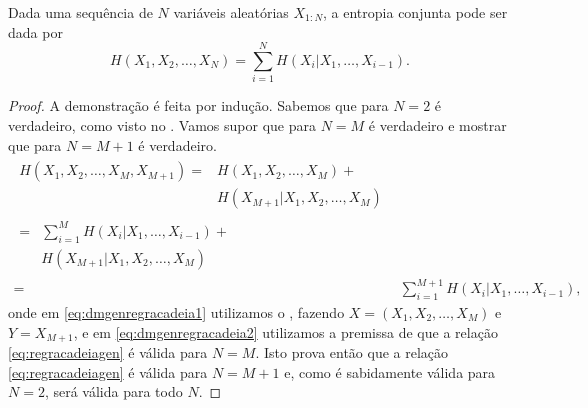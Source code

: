 \begin{proposition}\label{prop:regracadeiagen}
Dada uma sequência de $N$ variáveis aleatórias $X_{1:N}$, a entropia conjunta pode ser dada por 
\begin{equation}\label{eq:regracadeiagen}
H(X_1, X_2, \ldots, X_N) = \sum_{i=1}^{N} H(X_i|X_1, \ldots, X_{i-1}) .
\end{equation}
\end{proposition}
\begin{proof}
A demonstração é feita por indução. Sabemos que para $N=2$ é verdadeiro, como visto no .
Vamos supor que para $N=M$ é verdadeiro e mostrar que para $N=M+1$ é verdadeiro.
\begin{subequations}\label{eq:dmgenregracadeia}
\begin{align}
  \begin{split}
  H(X_1, X_2, \ldots, X_M, X_{M+1}) ={}& H(X_1, X_2, \ldots, X_M) + \\
                                       & H(X_{M+1} | X_1, X_2, \ldots, X_M) \label{eq:dmgenregracadeia1}
  \end{split}\\
  \begin{split}
                                    ={}& \sum_{i=1}^{M} H(X_i|X_1, \ldots, X_{i-1}) + \\
                                       & H(X_{M+1} | X_1, X_2, \ldots, X_M) \label{eq:dmgenregracadeia2}
  \end{split}\\
      ={}& \sum_{i=1}^{M+1} H(X_i|X_1, \ldots, X_{i-1}) ,
\end{align}
\end{subequations}
onde em \ref{eq:dmgenregracadeia1} utilizamos o , fazendo $X=(X_1, X_2, \ldots, X_M)$ e $Y=X_{M+1}$,
e em \ref{eq:dmgenregracadeia2} utilizamos a premissa de que a relação \ref{eq:regracadeiagen} é válida para $N=M$.
Isto prova então que a relação \ref{eq:regracadeiagen} é válida para $N=M+1$ e, como é sabidamente válida para $N=2$,
será válida para todo $N$.
\end{proof}


